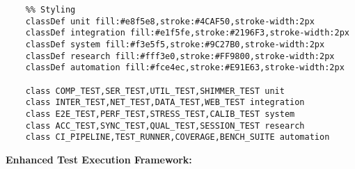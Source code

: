\documentclass[12pt,a4paper]{article}
\begin{document}
\begin{verbatim}
    %% Styling
    classDef unit fill:#e8f5e8,stroke:#4CAF50,stroke-width:2px
    classDef integration fill:#e1f5fe,stroke:#2196F3,stroke-width:2px
    classDef system fill:#f3e5f5,stroke:#9C27B0,stroke-width:2px
    classDef research fill:#fff3e0,stroke:#FF9800,stroke-width:2px
    classDef automation fill:#fce4ec,stroke:#E91E63,stroke-width:2px
    
    class COMP_TEST,SER_TEST,UTIL_TEST,SHIMMER_TEST unit
    class INTER_TEST,NET_TEST,DATA_TEST,WEB_TEST integration
    class E2E_TEST,PERF_TEST,STRESS_TEST,CALIB_TEST system
    class ACC_TEST,SYNC_TEST,QUAL_TEST,SESSION_TEST research
    class CI_PIPELINE,TEST_RUNNER,COVERAGE,BENCH_SUITE automation
\end{verbatim}

\textbf{Enhanced Test Execution Framework:}
\end{document}
